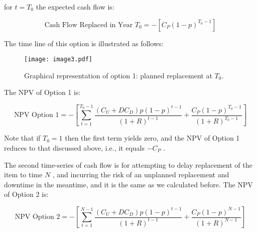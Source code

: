 for  \( t=T_{0} \)  the expected cash flow is:\par




\begin{equation}\label{npv_9}
\text{Cash Flow Replaced in Year }T_{0}= - \left[ C_{P} \left( 1-p \right) ^{T_{0}-1} \right]
\end{equation}


The time line of this option is illustrated as follows: \par






\begin{figure}
    \centering
    \centerline{\texttt{[image: image3.pdf]}}
    \caption{Graphical representation of option 1: planned replacement at $T_0$.}
    \label{fig:_Graphical_representation_of_option_1_planned_replacement_at_}
\end{figure}



The NPV of Option 1 is: \par




\begin{equation}\label{npv_10}
\mbox{NPV Option }1= - \left[  \sum _{t=1}^{T_{0}-1}\frac{ \left( C_{U}+DC_{D} \right) p \left( 1-p \right) ^{t-1}}{ \left( 1+R \right) ^{t-1}}+\frac{C_{P} \left( 1-p \right) ^{T_{0}-1}}{ \left( 1+R \right) ^{T_{0}-1}} \right]
\end{equation}


Note that if  \( T_{0}=1 \)  then the first term yields zero, and the NPV of Option 1 reduces to that discussed above, i.e., it equals  \( -C_{P} \) .\par

The second time-series of cash flow is for attempting to delay replacement of the item to time  \( N \) , and incurring the risk of an unplanned replacement and downtime in the meantime, and it is the same as we calculated before. The NPV of Option 2 is:\par




\begin{equation}\label{npv_11}
\mbox{NPV Option }2= - \left[  \sum _{t=1}^{N-1}\frac{ \left( C_{U}+DC_{D} \right) p \left( 1-p \right) ^{t-1}}{ \left( 1+R \right) ^{t-1}}+\frac{C_{P} \left( 1-p \right) ^{N-1}}{ \left( 1+R \right) ^{N-1}} \right]
\end{equation}


